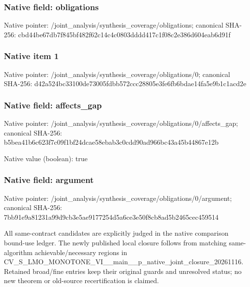 \documentclass[10pt,a4paper]{article}
\begin{document}
\subsubsection{Native field: obligations}
Native pointer: /joint\_\allowbreak{}analysis/synthesis\_\allowbreak{}coverage/obligations; canonical SHA-256: cbd44be67db7f845bf482f62c14c4c0803dddd417c1f08c2e386d604eab6d91f

\subsubsection{Native item 1}
Native pointer: /joint\_\allowbreak{}analysis/synthesis\_\allowbreak{}coverage/obligations/0; canonical SHA-256: d42a524bc33100de73005fdbb572ccc28805e3fe6fb6bdae14fa5e9b1c1acd2e

\subsubsection{Native field: affects\_\allowbreak{}gap}
Native pointer: /joint\_\allowbreak{}analysis/synthesis\_\allowbreak{}coverage/obligations/0/affects\_\allowbreak{}gap; canonical SHA-256: b5bea41b6c623f7c09f1bf24dcae58ebab3c0cdd90ad966bc43a45b44867e12b

Native value (boolean): true

\subsubsection{Native field: argument}
Native pointer: /joint\_\allowbreak{}analysis/synthesis\_\allowbreak{}coverage/obligations/0/argument; canonical SHA-256: 7bb91e9a81231a99d9cb3e5ae9177254d5a6ce3e50f8cb8ad5b2465cec459514

\begingroup\raggedright\sloppy All same-contract candidates are explicitly judged in the native comparison bound-use ledger. The newly published local closure follows from matching same-algorithm achievable/\allowbreak{}necessary regions in CV\_\allowbreak{}S\_\allowbreak{}LMO\_\allowbreak{}MONOTONE\_\allowbreak{}VI\_\allowbreak{}\_\allowbreak{}main\_\allowbreak{}\_\allowbreak{}p\_\allowbreak{}native\_\allowbreak{}joint\_\allowbreak{}closure\_\allowbreak{}20261116. Retained broad/\allowbreak{}fine entries keep their original guards and unresolved status;\allowbreak{} no new theorem or old-source recertification is claimed.\par\endgroup
\end{document}
